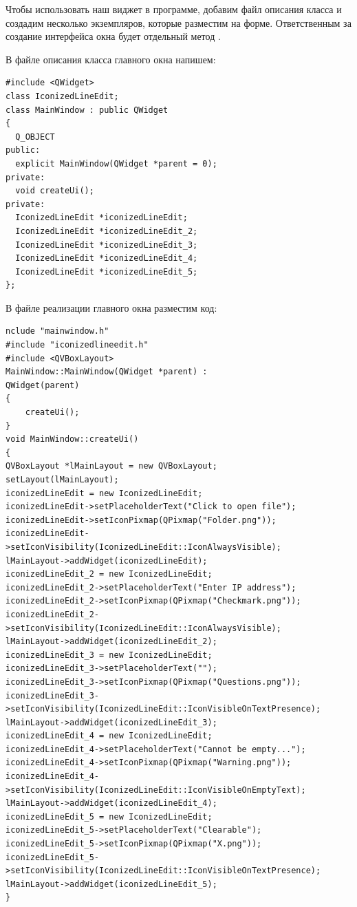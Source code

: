 Чтобы использовать наш виджет в программе, добавим файл описания класса и создадим несколько экземпляров, которые
разместим на форме. Ответственным за создание интерфейса окна будет отдельный метод .

В файле описания класса главного окна напишем:
\begin{lstlisting} 
#include <QWidget>
class IconizedLineEdit;
class MainWindow : public QWidget
{
  Q_OBJECT
public:
  explicit MainWindow(QWidget *parent = 0);
private:
  void createUi();
private:
  IconizedLineEdit *iconizedLineEdit;
  IconizedLineEdit *iconizedLineEdit_2;
  IconizedLineEdit *iconizedLineEdit_3;
  IconizedLineEdit *iconizedLineEdit_4;
  IconizedLineEdit *iconizedLineEdit_5;
};
\end{lstlisting}


В файле реализации главного окна разместим код:
\begin{lstlisting} 
nclude "mainwindow.h"
#include "iconizedlineedit.h"
#include <QVBoxLayout>
MainWindow::MainWindow(QWidget *parent) :
QWidget(parent)
{
    createUi();
}
void MainWindow::createUi()
{
QVBoxLayout *lMainLayout = new QVBoxLayout;
setLayout(lMainLayout);
iconizedLineEdit = new IconizedLineEdit;
iconizedLineEdit->setPlaceholderText("Click to open file");
iconizedLineEdit->setIconPixmap(QPixmap("Folder.png"));
iconizedLineEdit->setIconVisibility(IconizedLineEdit::IconAlwaysVisible);
lMainLayout->addWidget(iconizedLineEdit);
iconizedLineEdit_2 = new IconizedLineEdit;
iconizedLineEdit_2->setPlaceholderText("Enter IP address");
iconizedLineEdit_2->setIconPixmap(QPixmap("Checkmark.png"));
iconizedLineEdit_2->setIconVisibility(IconizedLineEdit::IconAlwaysVisible);
lMainLayout->addWidget(iconizedLineEdit_2);
iconizedLineEdit_3 = new IconizedLineEdit;
iconizedLineEdit_3->setPlaceholderText("");
iconizedLineEdit_3->setIconPixmap(QPixmap("Questions.png"));
iconizedLineEdit_3->setIconVisibility(IconizedLineEdit::IconVisibleOnTextPresence);
lMainLayout->addWidget(iconizedLineEdit_3);
iconizedLineEdit_4 = new IconizedLineEdit;
iconizedLineEdit_4->setPlaceholderText("Cannot be empty...");
iconizedLineEdit_4->setIconPixmap(QPixmap("Warning.png"));
iconizedLineEdit_4->setIconVisibility(IconizedLineEdit::IconVisibleOnEmptyText);
lMainLayout->addWidget(iconizedLineEdit_4);
iconizedLineEdit_5 = new IconizedLineEdit;
iconizedLineEdit_5->setPlaceholderText("Clearable");
iconizedLineEdit_5->setIconPixmap(QPixmap("X.png"));
iconizedLineEdit_5->setIconVisibility(IconizedLineEdit::IconVisibleOnTextPresence);
lMainLayout->addWidget(iconizedLineEdit_5);
}
\end{lstlisting}

